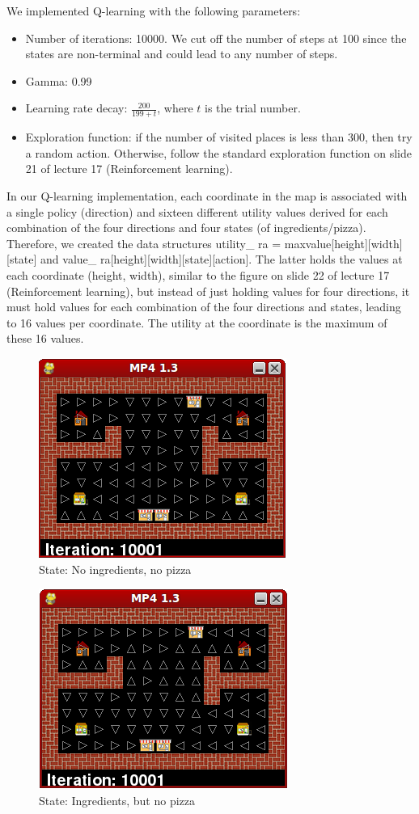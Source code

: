 We implemented Q-learning with the following parameters:
\begin{itemize}
  \item Number of iterations: 10000. We cut off the number of steps at 100 since the states are non-terminal and could lead to any number of steps.
  \item Gamma: 0.99
  \item Learning rate decay: $\frac{200}{199+t}$, where $t$ is the trial number.
  \item Exploration function: if the number of visited places is less than 300, then try a random action. Otherwise, follow the standard exploration function on slide 21 of lecture 17 (Reinforcement learning).
\end{itemize}

In our Q-learning implementation, each coordinate in the map is associated with a single policy (direction) and sixteen different utility values derived for each combination of the four directions and four states (of ingredients/pizza). Therefore, we created the data structures utility\_ ra = max{value[height][width][state]} and value\_ ra[height][width][state][action]. The latter holds the values at each coordinate (height, width), similar to the figure on slide 22 of lecture 17 (Reinforcement learning), but instead of just holding values for four directions, it must hold values for each combination of the four directions and states, leading to 16 values per coordinate. The utility at the coordinate is the maximum of these 16 values.

\begin{figure}[H]
  \centering
  \includegraphics[width=0.4\linewidth]{graphics/state0_13.png}
  \caption{State: No ingredients, no pizza}
\end{figure}

\begin{figure}[H]
  \centering
  \includegraphics[width=0.4\linewidth]{graphics/state1_13.png}
  \caption{State: Ingredients, but no pizza}
\end{figure}

